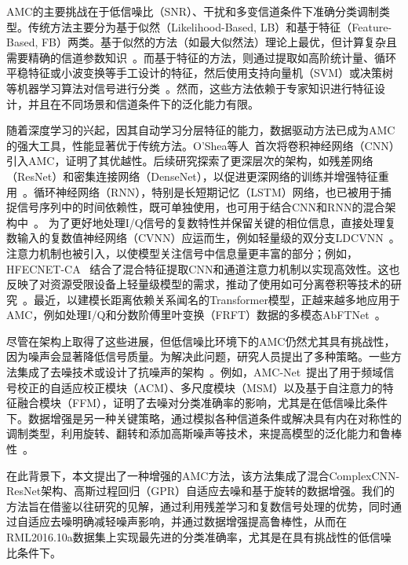 \documentclass{article}
\begin{document}
AMC的主要挑战在于低信噪比（SNR）、干扰和多变信道条件下准确分类调制类型。传统方法主要分为基于似然（Likelihood-Based, LB）和基于特征（Feature-Based, FB）两类。基于似然的方法（如最大似然法）理论上最优，但计算复杂且需要精确的信道参数知识~\cite{hameed2009likelihood}。而基于特征的方法，则通过提取如高阶统计量、循环平稳特征或小波变换等手工设计的特征，然后使用支持向量机（SVM）或决策树等机器学习算法对信号进行分类~\cite{hazza2013overview}。然而，这些方法依赖于专家知识进行特征设计，并且在不同场景和信道条件下的泛化能力有限。

随着深度学习的兴起，因其自动学习分层特征的能力，数据驱动方法已成为AMC的强大工具，性能显著优于传统方法。O'Shea等人~\cite{oshea2016convolutional}首次将卷积神经网络（CNN）引入AMC，证明了其优越性。后续研究探索了更深层次的架构，如残差网络（ResNet）和密集连接网络（DenseNet），以促进更深网络的训练并增强特征重用~\cite{west2017deep, patil2021automatic}。循环神经网络（RNN），特别是长短期记忆（LSTM）网络，也已被用于捕捉信号序列中的时间依赖性，既可单独使用，也可用于结合CNN和RNN的混合架构中~\cite{rajendran2018deep, xu2020spatiotemporal}。
为了更好地处理I/Q信号的复数特性并保留关键的相位信息，直接处理复数输入的复数值神经网络（CVNN）应运而生，例如轻量级的双分支LDCVNN~\cite{xu2025ldcvnn}。注意力机制也被引入，以使模型关注信号中信息量更丰富的部分；例如，HFECNET-CA~\cite{ma2023hfecnetca} 结合了混合特征提取CNN和通道注意力机制以实现高效性。这也反映了对资源受限设备上轻量级模型的需求，推动了使用如可分离卷积等技术的研究~\cite{guo2024ulcnn, ma2023hfecnetca, xu2025ldcvnn}。最近，以建模长距离依赖关系闻名的Transformer模型，正越来越多地应用于AMC，例如处理I/Q和分数阶傅里叶变换（FRFT）数据的多模态AbFTNet~\cite{ning2024abftnet}。

尽管在架构上取得了这些进展，但低信噪比环境下的AMC仍然尤其具有挑战性，因为噪声会显著降低信号质量。为解决此问题，研究人员提出了多种策略。一些方法集成了去噪技术或设计了抗噪声的架构~\cite{yao2019modulation}。例如，AMC-Net~\cite{zhang2023amcnet}提出了用于频域信号校正的自适应校正模块（ACM）、多尺度模块（MSM）以及基于自注意力的特征融合模块（FFM），证明了去噪对分类准确率的影响，尤其是在低信噪比条件下。数据增强是另一种关键策略，通过模拟各种信道条件或解决具有内在对称性的调制类型，利用旋转、翻转和添加高斯噪声等技术，来提高模型的泛化能力和鲁棒性~\cite{zhang2023efficient}。

在此背景下，本文提出了一种增强的AMC方法，该方法集成了混合ComplexCNN-ResNet架构、高斯过程回归（GPR）自适应去噪和基于旋转的数据增强。我们的方法旨在借鉴以往研究的见解，通过利用残差学习和复数信号处理的优势，同时通过自适应去噪明确减轻噪声影响，并通过数据增强提高鲁棒性，从而在RML2016.10a数据集上实现最先进的分类准确率，尤其是在具有挑战性的低信噪比条件下。
\end{document}
